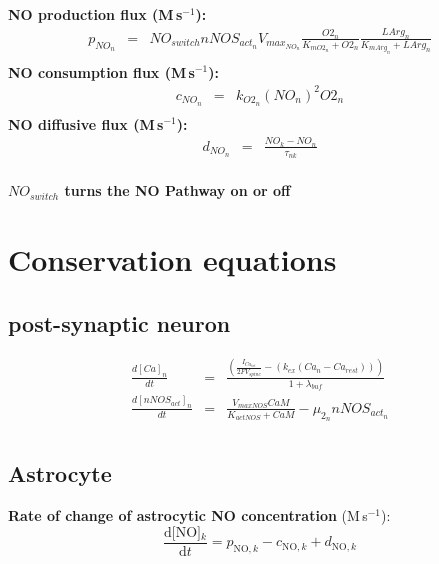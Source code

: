 \documentclass[fleqn]{report}
\numberwithin{equation}{section}
\numberwithin{equation}{section}
\newcommand{\NOk}{\text{[NO]$_k$}}
\newcommand{\uMpers}{\textmu M\,s$^{-1}$}
\newcommand\pNO[1]{\text{$p_{\text{NO},#1}$}}
\newcommand\cNO[1]{\text{$c_{\text{NO},#1}$}}
\newcommand\dNO[1]{\text{$d_{\text{NO},#1}$}}
\begin{document}
				            \textbf{NO production flux (\uMpers):}
				            \begin{eqnarray}
				                        p_{NO_{n}} &=& NO_{switch}   nNOS_{act_{n}} V_{max_{NO_{n}}}  \frac{O2_{n}}{K_{mO2_{n}} + O2_n}  \frac{LArg_{n}}{K_{mArg_{n}} + LArg_{n}}\\ %
				            \end{eqnarray}
			\textbf{	NO consumption flux (\uMpers):}
				\begin{eqnarray}
				                         c_{NO_{n}} &=& k_{O2_{n}}  (NO_{n})^2 O2_{n}\\ %
				\end{eqnarray}
\textbf{				NO diffusive flux (\uMpers):}
				\begin{eqnarray}
				                         d_{NO_{n}} &=& \frac{NO_{k} - NO_{n}}{\tau_{nk}}\\ %
				\end{eqnarray}

				                          
				            \textbf{$NO_{switch}$ turns the NO Pathway on or off}
				            
\chapter{Conservation equations}
\section{post-synaptic neuron}
\begin{eqnarray}
\frac{d [Ca]_{n}}{dt}&=&  \frac{( \frac{I_{Ca_{tot}}}{2 F V_{spine}}  - (k_{ex}  (Ca_{n} - Ca_{rest})))}{1 + \lambda_{buf}}\\%
 \frac{d  [nNOS_{act}]_{n}}{dt} &=&  \frac{V_{maxNOS}  CaM }{K_{actNOS} + CaM} -\mu _{2_{n}}  nNOS_{{act}_{n}}\\ %
\end{eqnarray}

\section{Astrocyte}
	\textbf{Rate of change of astrocytic NO concentration }(\uMpers):
	       		\begin{equation}  
	      			 \dfrac{\mathrm{d}\NOk}{\mathrm{d}t} = \pNO{k} - \cNO{k} + \dNO{k}
				\end{equation}   
	
\end{document}
